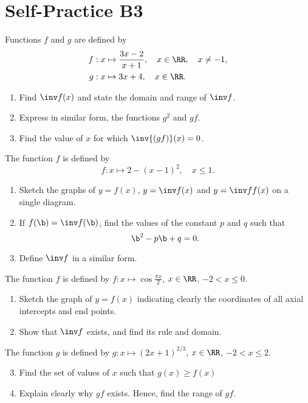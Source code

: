 \section{Self-Practice B3}

\begin{problem}
    Functions $f$ and $g$ are defined by
    \begin{align*}
        f &: x \mapsto \frac{3x-2}{x+1}, \quad x \in \RR, \quad x \neq -1,\\
        g &: x \mapsto 3x + 4, \quad x \in \RR.
    \end{align*}

    \begin{enumerate}
        \item Find $\inv f(x)$ and state the domain and range of $\inv f$.
        \item Express in similar form, the functions $g^2$ and $gf$.
        \item Find the value of $x$ for which $\inv{(gf)} (x) = 0$.
    \end{enumerate}
\end{problem}

\begin{problem}
    The function $f$ is defined by \[f : x \mapsto 2 - (x-1)^2, \quad x \leq 1.\]

    \begin{enumerate}
        \item Sketch the graphs of $y = f(x)$, $y = \inv f(x)$ and $y = \inv f f(x)$ on a single diagram.
        \item If $f(\b) = \inv f(\b)$, find the values of the constant $p$ and $q$ such that \[\b^2 - p\b + q = 0.\]
        \item Define $\inv f$ in a similar form.   
    \end{enumerate}
\end{problem}

\begin{problem}
    The function $f$ is defined by $f : x \mapsto \cos \frac{\pi x}{2}$, $x \in \RR$, $-2 < x \leq 0$.

    \begin{enumerate}
        \item Sketch the graph of $y=f(x)$ indicating clearly the coordinates of all axial intercepts and end points.
        \item Show that $\inv f$ exists, and find its rule and domain.
    \end{enumerate}

    The function $g$ is defined by $g : x \mapsto (2x+1)^{2/3}$, $x \in \RR$, $-2 < x \leq 2$.

    \begin{enumerate}
        \setcounter{enumi}{2}
        \item Find the set of values of $x$ such that $g(x) \geq f(x)$
        \item Explain clearly why $gf$ exists. Hence, find the range of $gf$.
    \end{enumerate}
\end{problem}

